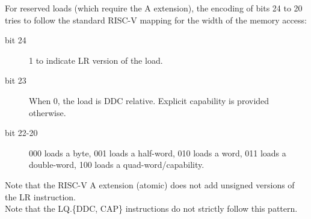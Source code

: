 {For reserved loads (which require the A extension), the encoding of bits 24 to
20 tries to follow the standard RISC-V mapping for the width of the memory
access:
\begin{description}
\item [bit 24] 1 to indicate LR version of the load.
\item [bit 23] When 0, the load is DDC relative. Explicit capability is provided otherwise.
\item [bit 22-20] 000 loads a byte, 001 loads a half-word, 010 loads a word, 011 loads a double-word, 100 loads a quad-word/capability.
\end{description}

Note that the RISC-V A extension (atomic) does not add unsigned versions of the
LR instruction.\\
Note that the LQ.\{DDC, CAP\} instructions do not strictly follow this
pattern.\\

\vspace{1em}

\rvcheriheader
{}






















}

